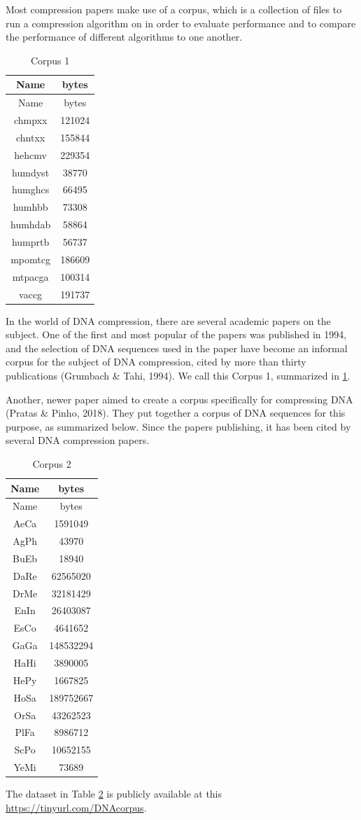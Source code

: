 \documentclass[12pt,twoside]{reedthesis}
\begin{document}
Most compression papers make use of a corpus, which is a collection of files to run a compression algorithm on in order to evaluate performance and to compare the performance of different algorithms to one another.
\begin{longtable}[]{@{}cc@{}}
\caption{\label{tab:corpus1filesfig}Corpus 1}\tabularnewline
\toprule()
Name & bytes \\
\midrule()
\endfirsthead
\toprule()
Name & bytes \\
\midrule()
\endhead
chmpxx & 121024 \\
chntxx & 155844 \\
hehcmv & 229354 \\
humdyst & 38770 \\
humghcs & 66495 \\
humhbb & 73308 \\
humhdab & 58864 \\
humprtb & 56737 \\
mpomtcg & 186609 \\
mtpacga & 100314 \\
vaccg & 191737 \\
\bottomrule()
\end{longtable}
In the world of DNA compression, there are several academic papers on the subject. One of the first and most popular of the papers was published in 1994, and the selection of DNA sequences used in the paper have become an informal corpus for the subject of DNA compression, cited by more than thirty publications (Grumbach \& Tahi, 1994). We call this Corpus 1, summarized in \ref{tab:corpus1filesfig}.

Another, newer paper aimed to create a corpus specifically for compressing DNA (Pratas \& Pinho, 2018). They put together a corpus of DNA sequences for this purpose, as summarized below. Since the papers publishing, it has been cited by several DNA compression papers.
\begin{longtable}[]{@{}cc@{}}
\caption{\label{tab:corpus2filesfig}Corpus 2}\tabularnewline
\toprule()
Name & bytes \\
\midrule()
\endfirsthead
\toprule()
Name & bytes \\
\midrule()
\endhead
AeCa & 1591049 \\
AgPh & 43970 \\
BuEb & 18940 \\
DaRe & 62565020 \\
DrMe & 32181429 \\
EnIn & 26403087 \\
EsCo & 4641652 \\
GaGa & 148532294 \\
HaHi & 3890005 \\
HePy & 1667825 \\
HoSa & 189752667 \\
OrSa & 43262523 \\
PlFa & 8986712 \\
ScPo & 10652155 \\
YeMi & 73689 \\
\bottomrule()
\end{longtable}
The dataset in Table \ref{tab:corpus2filesfig} is publicly available at this \url{https://tinyurl.com/DNAcorpus}.
\end{document}

